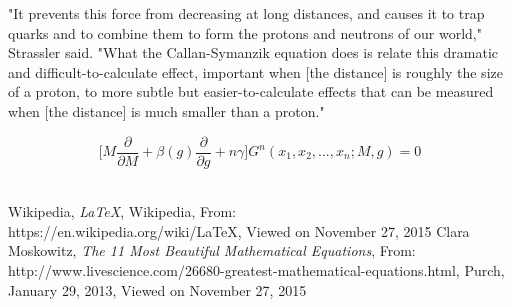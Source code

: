 \documentclass[12pt,twocolumn]{article}
\begin{document}
"It prevents this force from decreasing at long distances, and causes it to trap quarks and to combine them to form the protons and neutrons of our world," Strassler said. "What the Callan-Symanzik equation does is relate this dramatic and difficult-to-calculate effect, important when [the distance] is roughly the size of a proton, to more subtle but easier-to-calculate effects that can be measured when [the distance] is much smaller than a proton." \cite{ClaraM}

	\begin{equation}
 	\Bigg[M\frac{\partial}{\partial M}+\beta(g)\frac{\partial}{\partial g}+n\gamma 			\Bigg] G^{n}(x_{1},x_{2},...,x_{n};M,g)=0
	\end{equation}
\\
 \endgroup
 
 \begingroup
  \onecolumn
  \begin{center}
   \begin{thebibliography}{2}
     Wikipedia,
     \emph{LaTeX}, Wikipedia, From: \\
      https://en.wikipedia.org/wiki/LaTeX,
      Viewed on November 27, 2015 
     Clara Moskowitz,
     \emph{The 11 Most Beautiful Mathematical Equations},
      From: http://www.livescience.com/26680-greatest-mathematical-equations.html,
      Purch, January 29, 2013, Viewed on November 27, 2015
	\end{thebibliography}
  \end{center}
 \endgroup
\end{document}
